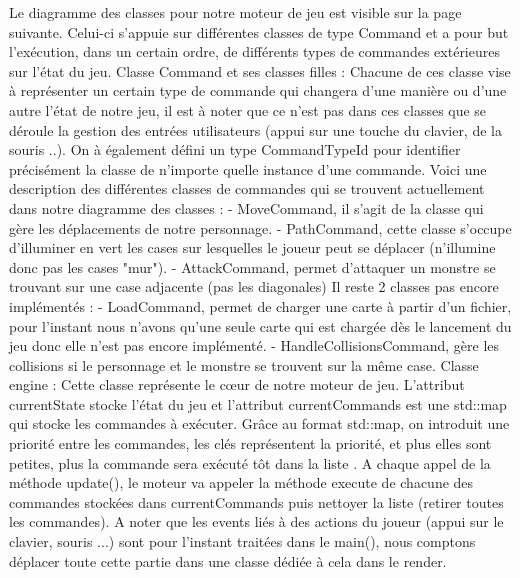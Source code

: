\documentclass[a4paper,12pt]{article}
\begin{document}
Le diagramme des classes pour notre moteur de jeu est visible sur la page suivante. Celui-ci s'appuie sur différentes classes de type Command et a pour but l’exécution, dans un certain ordre, de différents types de commandes extérieures sur l'état du jeu.
\bigbreak
Classe Command et ses classes filles :
Chacune de ces classe vise à représenter un certain type de commande qui changera d'une manière ou d'une autre l'état de notre jeu, il est à noter que ce n'est pas dans ces classes que se déroule la gestion des entrées utilisateurs (appui sur une touche du clavier, de la souris ..).
On à également défini un type CommandTypeId pour identifier précisément la classe de n'importe quelle instance d'une commande.
Voici une description des différentes classes de commandes qui se trouvent actuellement dans notre diagramme des classes :
- MoveCommand, il s'agit de la classe qui gère les déplacements de notre personnage.
- PathCommand, cette classe s'occupe d'illuminer en vert les cases sur lesquelles le joueur peut se déplacer (n'illumine donc pas les cases "mur").
- AttackCommand, permet d'attaquer un monstre se trouvant sur une case adjacente (pas les diagonales)
Il reste 2 classes pas encore implémentés :
- LoadCommand, permet de charger une carte à partir d'un fichier, pour l'instant nous n'avons qu'une seule carte qui est chargée dès le lancement du jeu donc elle n'est pas encore implémenté.
- HandleCollisionsCommand, gère les collisions si le personnage et le monstre se trouvent sur la même case.
\bigbreak
Classe engine :
Cette classe représente le cœur de notre moteur de jeu. L'attribut currentState stocke l'état du jeu et l'attribut currentCommands est une std::map qui stocke les commandes à exécuter.
Grâce au format std::map, on introduit une priorité entre les commandes, les clés représentent la priorité, et plus elles sont petites, plus la commande sera exécuté tôt dans la liste .
A chaque appel de la méthode update(), le moteur va appeler la méthode execute de chacune des commandes stockées dans currentCommands puis nettoyer la liste (retirer toutes les commandes).
\bigbreak
A noter que les events liés à des actions du joueur (appui sur le clavier, souris ...) sont pour l'instant traitées dans le main(), nous comptons déplacer toute cette partie dans une classe dédiée à cela dans le render.
\end{document}
